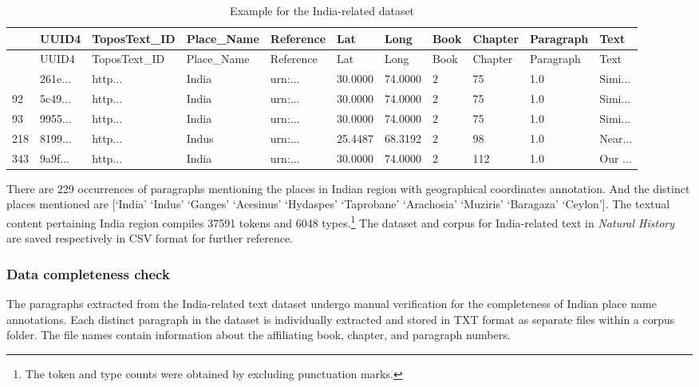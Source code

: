 \documentclass[
  12pt,
]{article}
\begin{document}
\hypertarget{tbl-dataset_indiatext}{}
\begin{longtable}[]{@{}lllllllllll@{}}
\caption{\label{tbl-dataset_indiatext}Example for the India-related
dataset}\tabularnewline
\toprule\noalign{}
& UUID4 & ToposText\_ID & Place\_Name & Reference & Lat & Long & Book &
Chapter & Paragraph & Text \\
\midrule\noalign{}
\endfirsthead
\toprule\noalign{}
& UUID4 & ToposText\_ID & Place\_Name & Reference & Lat & Long & Book &
Chapter & Paragraph & Text \\
\midrule\noalign{}
\endhead
\bottomrule\noalign{}
\endlastfoot
85 & 261e... & http... & India & urn:... & 30.0000 & 74.0000 & 2 & 75 &
1.0 & Simi... \\
92 & 5c49... & http... & India & urn:... & 30.0000 & 74.0000 & 2 & 75 &
1.0 & Simi... \\
93 & 9955... & http... & India & urn:... & 30.0000 & 74.0000 & 2 & 75 &
1.0 & Simi... \\
218 & 8199... & http... & Indus & urn:... & 25.4487 & 68.3192 & 2 & 98 &
1.0 & Near... \\
343 & 9a9f... & http... & India & urn:... & 30.0000 & 74.0000 & 2 & 112
& 1.0 & Our ... \\
\end{longtable}

There are 229 occurrences of paragraphs mentioning the places in Indian
region with geographical coordinates annotation. And the distinct places
mentioned are {[}`India' `Indus' `Ganges' `Acesinus' `Hydaspes'
`Taprobane' `Arachosia' `Muziris' `Baragaza' `Ceylon'{]}. The textual
content pertaining India region compiles 37591 tokens and 6048
types.\footnote{The token and type counts were obtained by excluding
  punctuation marks.} The dataset and corpus for India-related text in
\emph{Natural History} are saved respectively in CSV format for further
reference.

\hypertarget{data-completeness-check}{%
\subsubsection{Data completeness check}\label{data-completeness-check}}

The paragraphs extracted from the India-related text dataset undergo
manual verification for the completeness of Indian place name
annotations. Each distinct paragraph in the dataset is individually
extracted and stored in TXT format as separate files within a corpus
folder. The file names contain information about the affiliating book,
chapter, and paragraph numbers.
\end{document}
